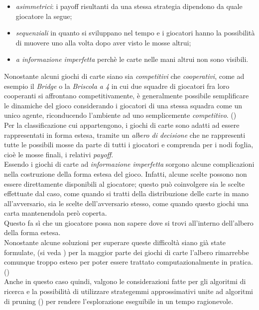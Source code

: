 \begin{itemize}
   \item \emph{asimmetrici}: i payoff risultanti da una stessa strategia dipendono da quale giocatore la segue;
   \item \emph{sequenziali} in quanto si sviluppano nel tempo e i giocatori hanno la possibilità di muovere uno alla volta dopo aver visto le mosse altrui;
   \item \emph{a informazione imperfetta}  perchè le carte nelle mani altrui non sono visibili.
\end{itemize}
\noindent
Nonostante alcuni giochi di carte siano sia \emph{competitivi} che \emph{cooperativi}, come ad esempio il \emph{Bridge} o la \emph{Briscola a 4} in cui due squadre di giocatori fra loro cooperanti si affrontano competitivamente, è generalmente possibile semplificare le dinamiche del gioco considerando i giocatori di una stessa squadra come un unico agente, riconducendo l'ambiente ad uno semplicemente \emph{competitivo}. (\cite{pavel})\\
Per la classificazione cui appartengono, i giochi di carte sono adatti ad essere rappresentati in forma estesa, tramite un \emph{albero di decisione} che ne rappresenti tutte le possibili mosse da parte di tutti i giocatori e comprenda per i nodi foglia, cioè le mosse finali, i relativi \emph{payoff}.\\
Essendo i giochi di carte ad \emph{informazione imperfetta} sorgono alcune complicazioni nella costruzione della forma estesa del gioco.
Infatti, alcune scelte possono non essere direttamente disponibili al giocatore; questo può coinvolgere sia le scelte effettuate dal caso, come quando si tratti della distribuzione delle carte in mano all'avversario, sia le scelte dell'avversario stesso, come quando questo giochi una carta mantenendola però coperta.\\
Questo fa sì che un giocatore possa non sapere dove si trovi all'interno dell'albero della forma estesa.\\
Nonostante alcune soluzioni per superare queste difficoltà siano già state formulate, (si veda \cite{wiley}) per la maggior parte dei giochi di carte l'albero rimarrebbe comunque troppo esteso per poter essere trattato computazionalmente in pratica. (\cite{frank})\\
Anche in questo caso quindi, valgono le considerazioni fatte per gli algoritmi di ricerca e la possibilità di utilizzare strategemmi approssimativi unite ad algoritmi di pruning (\cite{pavel}) per rendere l'esplorazione eseguibile in un tempo ragionevole.
